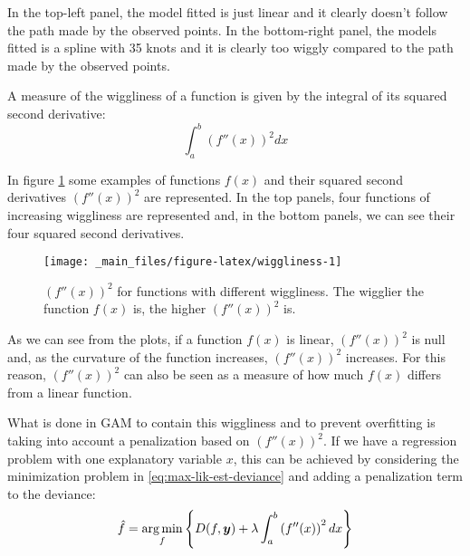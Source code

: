 \documentclass[a4paper, nobind]{templates/ociamthesis}
\theoremstyle{definition}
\theoremstyle{definition}
\theoremstyle{definition}
\theoremstyle{remark}
\begin{document}
In the top-left panel, the model fitted is just linear and it clearly doesn't follow the path made by the observed points. In the bottom-right panel, the models fitted is a spline with 35 knots and it is clearly too wiggly compared to the path made by the observed points.

A measure of the wiggliness of a function is given by the integral of its squared second derivative:
\begin{equation}
\label{eq:wiggliness}
\int_{a}^{b}{\left( f''(x) \right)^2 dx}
\end{equation}

In figure \ref{fig:wiggliness} some examples of functions \(f(x)\) and their squared second derivatives \(\left(f''(x)\right)^2\) are represented. In the top panels, four functions of increasing wiggliness are represented and, in the bottom panels, we can see their four squared second derivatives.





\begin{figure}[!hbtp]

{\centering \texttt{[image: \_main\_files/figure-latex/wiggliness-1]} 

}

\caption[\(\left(f''(x)\right)^2\) for functions with different wiggliness.]{\(\left(f''(x)\right)^2\) for functions with different wiggliness. The wigglier the function \(f(x)\) is, the higher \(\left(f''(x)\right)^2\) is.}\label{fig:wiggliness}
\end{figure}

As we can see from the plots, if a function \(f(x)\) is linear, \(\left(f''(x)\right)^2\) is null and, as the curvature of the function increases, \(\left(f''(x)\right)^2\) increases. For this reason, \(\left(f''(x)\right)^2\) can also be seen as a measure of how much \(f(x)\) differs from a linear function.

What is done in GAM to contain this wiggliness and to prevent overfitting is taking into account a penalization based on \(\left(f''(x)\right)^2\). If we have a regression problem with one explanatory variable \(x\), this can be achieved by considering the minimization problem in \eqref{eq:max-lik-est-deviance} and adding a penalization term to the deviance:
\begin{equation}
\label{eq:gam-est-deviance}
\hat{f} = \operatorname*{arg\,min}_{f}{\left\{D(f, \boldsymbol{y}) + \lambda \int_{a}^{b}{\left( f''(x) \right)^2 dx}\right\}}
\end{equation}
\end{document}

